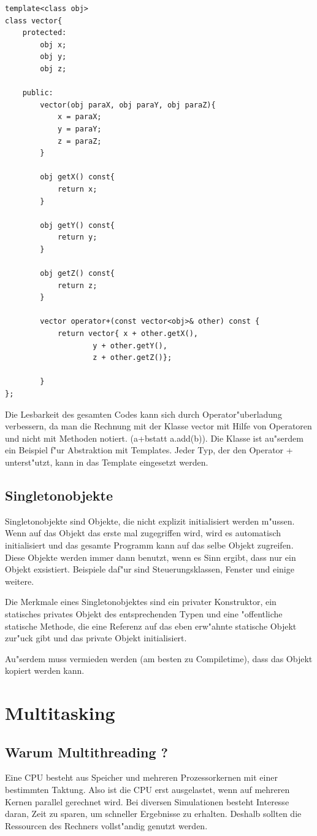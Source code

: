 \documentclass[14pt, a4paper]{report}
\begin{document}
\begin{lstlisting}
template<class obj>
class vector{
	protected:
		obj x;
		obj y;
		obj z;

	public:
		vector(obj paraX, obj paraY, obj paraZ){
			x = paraX;
			y = paraY;
			z = paraZ;
		}

		obj getX() const{
			return x;
		}

		obj getY() const{
			return y;
		}
		
		obj getZ() const{
			return z;
		}
		
		vector operator+(const vector<obj>& other) const {
			return vector{ x + other.getX(), 
					y + other.getY(), 
					z + other.getZ()}; 

		}
};
\end{lstlisting}

Die Lesbarkeit des gesamten Codes kann sich durch Operator"uberladung verbessern, da man
die Rechnung mit der Klasse vector mit Hilfe von Operatoren und nicht mit Methoden notiert.
(\glqq a+b\grqq statt \glqq a.add(b)\grqq). Die Klasse ist au"serdem ein Beispiel f"ur 
Abstraktion mit Templates. Jeder
Typ, der den Operator + unterst"utzt, kann in das Template eingesetzt werden.

\section{Singletonobjekte}
Singletonobjekte sind Objekte, die nicht explizit initialisiert werden m"ussen. Wenn auf
das Objekt das erste mal zugegriffen wird, wird es automatisch initialisiert und das
gesamte Programm kann auf das selbe Objekt zugreifen. Diese Objekte werden immer
dann benutzt, wenn es Sinn ergibt, dass nur ein Objekt exsistiert. Beispiele daf"ur
sind Steuerungsklassen, Fenster und einige weitere.

Die Merkmale eines Singletonobjektes sind ein privater Konstruktor, ein statisches 
privates Objekt des entsprechenden Typen und eine "offentliche statische Methode, die 
eine Referenz auf das eben erw"ahnte statische Objekt zur"uck gibt und das private
Objekt initialisiert.

Au"serdem muss vermieden werden (am besten zu Compiletime), dass das Objekt 
kopiert werden kann.

\chapter{Multitasking}
\section{Warum Multithreading ?}
Eine CPU besteht aus Speicher und mehreren Prozessorkernen mit einer bestimmten
Taktung. Also ist die CPU erst ausgelastet, wenn auf mehreren Kernen parallel
gerechnet wird. Bei diversen Simulationen besteht Interesse daran, Zeit zu sparen, um
schneller Ergebnisse zu erhalten. Deshalb sollten die Ressourcen des Rechners 
vollst"andig genutzt werden.
\end{document}
